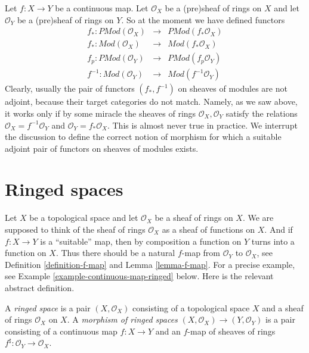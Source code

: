 \noindent
Let $f : X \to Y$ be a continuous map.
Let $\mathcal{O}_X$ be a (pre)sheaf of rings on $X$ and
let $\mathcal{O}_Y$ be a (pre)sheaf of rings on $Y$.
So at the moment we have defined functors
\begin{eqnarray*}
f_* : \textit{PMod}(\mathcal{O}_X) &
\longrightarrow &
\textit{PMod}(f_*\mathcal{O}_X) \\
f_* : \textit{Mod}(\mathcal{O}_X) &
\longrightarrow &
\textit{Mod}(f_*\mathcal{O}_X) \\
f_p : \textit{PMod}(\mathcal{O}_Y) &
\longrightarrow &
\textit{PMod}(f_p\mathcal{O}_Y) \\
f^{-1} : \textit{Mod}(\mathcal{O}_Y) &
\longrightarrow &
\textit{Mod}(f^{-1}\mathcal{O}_Y)
\end{eqnarray*}
Clearly, usually the pair of functors $(f_*, f^{-1})$
on sheaves of modules are not adjoint, because their target categories
do not match. Namely, as we saw above, it works only if by some miracle the
sheaves of rings $\mathcal{O}_X, \mathcal{O}_Y$ satisfy the
relations $\mathcal{O}_X = f^{-1}\mathcal{O}_Y$ and
$\mathcal{O}_Y = f_*\mathcal{O}_X$. This is almost never
true in practice. We interrupt the discussion to define
the correct notion of morphism for which a suitable adjoint
pair of functors on sheaves of modules exists.

\section{Ringed spaces}
\label{section-ringed-spaces}

\noindent
Let $X$ be a topological space and let $\mathcal{O}_X$
be a sheaf of rings on $X$. We are supposed to
think of the sheaf of rings $\mathcal{O}_X$ as a sheaf of functions
on $X$. And if $f : X \to Y$ is a ``suitable'' map, then by composition
a function on $Y$ turns into a function on $X$.
Thus there should be a natural
$f$-map from $\mathcal{O}_Y$ to $\mathcal{O}_X$,
see Definition \ref{definition-f-map} and
Lemma \ref{lemma-f-map}.
For a precise example, see
Example \ref{example-continuous-map-ringed} below. Here is the
relevant abstract definition.

\begin{definition}
\label{definition-ringed-space}
A {\it ringed space} is a pair $(X, \mathcal{O}_X)$ consisting
of a topological space $X$ and a sheaf of rings $\mathcal{O}_X$
on $X$. A {\it morphism of ringed spaces}
$(X, \mathcal{O}_X) \to (Y, \mathcal{O}_Y)$ is a pair
consisting of a continuous map $f : X \to Y$ and an
$f$-map of sheaves of rings
$f^\sharp : \mathcal{O}_Y \to \mathcal{O}_X$.
\end{definition}

